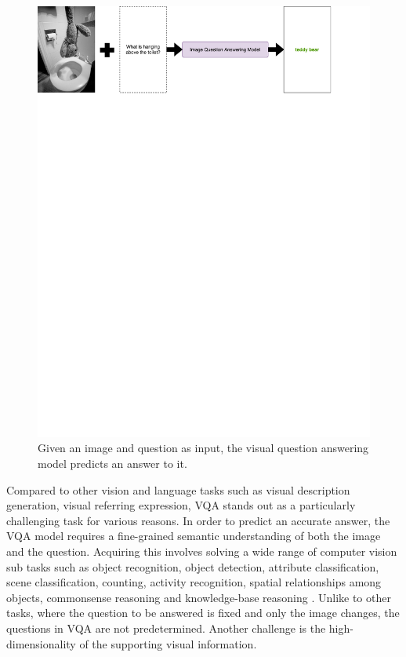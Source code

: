 \documentclass{article}
\begin{document}
\begin{figure}[H]
	\centering
	\includegraphics[width=\linewidth]{vqa_teddy.pdf}
	\caption{Given an image and question as input, the visual question answering model predicts an answer to it.}
	\label{fig:vqa-graph}
\end{figure}

Compared to other vision and language tasks such as visual description generation, visual referring expression, VQA stands out as a particularly challenging task for various reasons. In order to predict an accurate answer, the VQA model requires a fine-grained semantic understanding of both the image and the question. Acquiring this involves solving a wide range of computer vision sub tasks such as object recognition, object detection, attribute classification, scene classification, counting, activity recognition, spatial relationships among objects, commonsense reasoning and knowledge-base reasoning \citep{manmadhan2020vqa}. Unlike to other tasks, where the question to be answered is fixed and only the image changes, the questions in VQA are not predetermined. Another challenge is the high-dimensionality of the supporting visual information.
\end{document}

